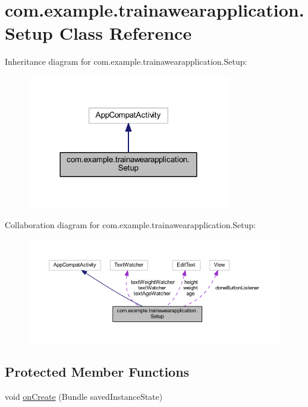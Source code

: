 \hypertarget{classcom_1_1example_1_1trainawearapplication_1_1_setup}{}\section{com.\+example.\+trainawearapplication.\+Setup Class Reference}
\label{classcom_1_1example_1_1trainawearapplication_1_1_setup}


Inheritance diagram for com.\+example.\+trainawearapplication.\+Setup\+:
\nopagebreak
\begin{figure}[H]
\begin{center}
\leavevmode
\includegraphics[width=252pt]{classcom_1_1example_1_1trainawearapplication_1_1_setup__inherit__graph}
\end{center}
\end{figure}


Collaboration diagram for com.\+example.\+trainawearapplication.\+Setup\+:
\nopagebreak
\begin{figure}[H]
\begin{center}
\leavevmode
\includegraphics[width=350pt]{classcom_1_1example_1_1trainawearapplication_1_1_setup__coll__graph}
\end{center}
\end{figure}
\subsection*{Protected Member Functions}
\begin{DoxyCompactItemize}
\item 
void \mbox{\hyperlink{classcom_1_1example_1_1trainawearapplication_1_1_setup_a52f522c34d14c93dbf7f75ff75ce606d}{on\+Create}} (Bundle saved\+Instance\+State)
\end{DoxyCompactItemize}

